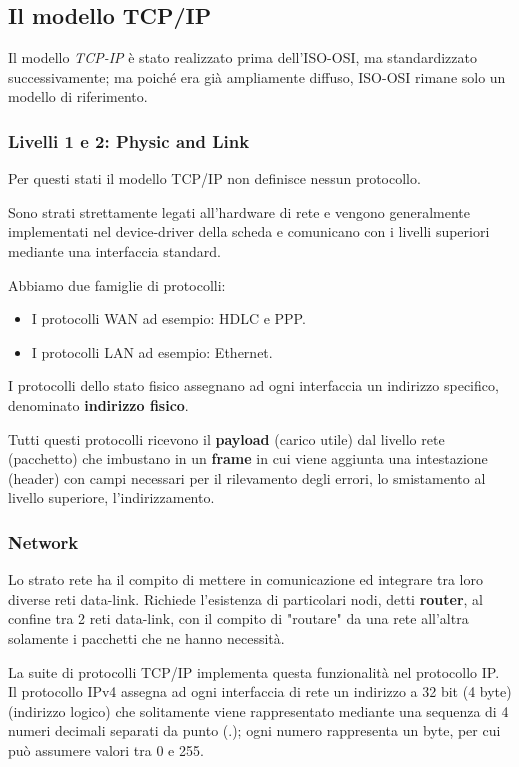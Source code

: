     \subsection{Il modello TCP/IP}
        Il modello \textit{TCP-IP} è stato realizzato prima dell'ISO-OSI, ma standardizzato successivamente; ma poiché era già ampliamente diffuso, ISO-OSI rimane solo un modello di riferimento.

        \subsubsection{Livelli 1 e 2: Physic and Link}
            Per questi stati il modello TCP/IP non definisce nessun protocollo.
        
            Sono strati strettamente legati all'hardware di rete e vengono generalmente implementati nel device-driver della scheda e comunicano con i livelli superiori mediante una interfaccia standard.
    
            Abbiamo due famiglie di protocolli:
            \begin{itemize}
                \item I protocolli WAN ad esempio: HDLC e PPP.
                \item I protocolli LAN ad esempio: Ethernet.
            \end{itemize}

            I protocolli dello stato fisico assegnano ad ogni interfaccia un indirizzo specifico, denominato \textbf{indirizzo fisico}.

            Tutti questi protocolli ricevono il \textbf{payload} (carico utile) dal livello rete (pacchetto) che imbustano in un \textbf{frame} in cui viene aggiunta una intestazione (header) con campi necessari per il rilevamento degli errori, lo smistamento al livello superiore, l'indirizzamento.

        \subsubsection{Network}
            Lo strato rete ha il compito di mettere in comunicazione ed integrare tra loro diverse reti data-link. Richiede l'esistenza di particolari nodi, detti \textbf{router}, al confine tra 2 reti data-link, con il compito di "routare" da una rete all’altra solamente i pacchetti che ne hanno necessità.

            La suite di protocolli TCP/IP implementa questa funzionalità nel protocollo IP. Il protocollo IPv4 assegna ad ogni interfaccia di rete un indirizzo a 32 bit (4 byte) (indirizzo logico) che solitamente viene rappresentato mediante una sequenza di 4 numeri decimali separati da punto (.); ogni numero rappresenta un byte, per cui può assumere valori tra 0 e 255.


